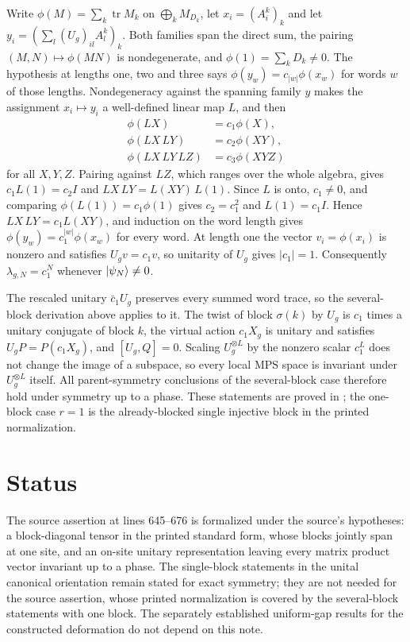 \documentclass{article}
\begin{document}
Write $\phi(M)=\sum_k\operatorname{tr}M_k$ on $\bigoplus_kM_{D_k}$, let
$x_i=(A^k_i)_k$ and let $y_i=(\sum_l(U_g)_{il}A^k_l)_k$. Both families span
the direct sum, the pairing $(M,N)\mapsto\phi(MN)$ is nondegenerate, and
$\phi(1)=\sum_kD_k\neq0$. The hypothesis at lengths one, two and three says
$\phi(y_w)=c_{|w|}\phi(x_w)$ for words $w$ of those lengths. Nondegeneracy
against the spanning family $y$ makes the assignment $x_i\mapsto y_i$ a
well-defined linear map $L$, and then
\begin{align}
    \phi(LX)&=c_1\phi(X),
    \label{eq:spc11_phase_linear}\\
    \phi(LX\,LY)&=c_2\phi(XY),
    \label{eq:spc11_phase_quadratic}\\
    \phi(LX\,LY\,LZ)&=c_3\phi(XYZ)
    \label{eq:spc11_phase_cubic}
\end{align}
for all $X,Y,Z$. Pairing against $LZ$, which ranges over the whole algebra,
gives $c_1L(1)=c_2I$ and $LX\,LY=L(XY)\,L(1)$. Since $L$ is onto,
$c_1\neq0$, and comparing $\phi(L(1))=c_1\phi(1)$ gives $c_2=c_1^2$ and
$L(1)=c_1I$. Hence $LX\,LY=c_1L(XY)$, and induction on the word length gives
$\phi(y_w)=c_1^{|w|}\phi(x_w)$ for every word. At length one the vector
$v_i=\phi(x_i)$ is nonzero and satisfies $U_gv=c_1v$, so unitarity of $U_g$
gives $|c_1|=1$. Consequently $\lambda_{g,N}=c_1^N$ whenever
$|\psi_N\rangle\neq0$.

The rescaled unitary $\bar c_1U_g$ preserves every summed word trace, so the
several-block derivation above applies to it. The twist of block
$\sigma(k)$ by $U_g$ is $c_1$ times a unitary conjugate of block $k$, the
virtual action $c_1X_g$ is unitary and satisfies $U_gP=P(c_1X_g)$, and
$[U_g,Q]=0$. Scaling $U_g^{\otimes L}$ by the nonzero scalar $c_1^L$ does not
change the image of a subspace, so every local MPS space is invariant under
$U_g^{\otimes L}$ itself. All parent-symmetry conclusions of the
several-block case therefore hold under symmetry up to a phase. These
statements are proved in
;
the one-block case $r=1$ is the already-blocked single injective block in the
printed normalization.

\section{Status}
The source assertion at lines 645--676 is formalized under the source's
hypotheses: a block-diagonal tensor in the printed standard form, whose
blocks jointly span at one site, and an on-site unitary representation
leaving every matrix product vector invariant up to a phase. The
single-block statements in the unital canonical orientation remain stated
for exact symmetry; they are not needed for the source assertion, whose
printed normalization is covered by the several-block statements with one
block. The separately established uniform-gap results for the constructed
deformation do not depend on this note.



\end{document}
